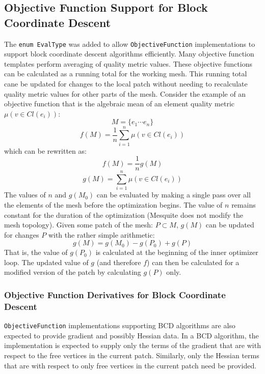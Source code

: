 \documentclass{article}
\begin{document}
\subsection{Objective Function Support for Block Coordinate Descent}

The \texttt{enum EvalType} was added to allow \texttt{ObjectiveFunction} implementations to support block coordinate descent algorithms efficiently.  Many objective function templates perform averaging of quality metric values.  These objective functions can be calculated as a running total for the working mesh.  This running total cane be updated for changes to the local patch without needing to recalculate quality metric values for other parts of the mesh.  Consider the example of an objective function that is the algebraic mean of an element quality metric $\mu(v \in Cl(e_i))$:
\begin{displaymath}
M = \{ e_1 \cdots e_n \}
\end{displaymath}
\begin{displaymath}
f(M) = \frac{1}{n}\sum_{i=1}^{n}\mu(v \in Cl(e_i))
\end{displaymath}
which can be rewritten as:
\begin{displaymath}
f(M) = \frac{1}{n}g(M)
\end{displaymath}
\begin{displaymath}
g(M) = \sum_{i=1}^{n}\mu(v \in Cl(e_i))
\end{displaymath}
The values of $n$ and $g(M_0)$ can be evaluated by making a single pass over all the elements of the mesh before the optimization begins.  The value of $n$ remains constant for the duration of the optimization (Mesquite does not modify the mesh topology).  Given some patch of the mesh: $P \subset M$, $g(M)$ can be updated for changes $P$ with the rather simple arithmetic:
\begin{displaymath}
g(M) = g(M_0) - g(P_0) + g(P)
\end{displaymath}
That is, the value of $g(P_0)$ is calculated at the beginning of the inner optimizer loop.  The updated value of $g$ (and therefore $f$) can then be calculated for a modified version of the patch by calculating $g(P)$ only.


\subsubsection{Objective Function Derivatives for Block Coordinate Descent}

\texttt{ObjectiveFunction} implementations supporting BCD algorithms are also expected to provide gradient and possibly Hessian data.  In a BCD algorithm, the implementation is expected to supply only the terms of the gradient that are with respect to the free vertices in the current patch.  Similarly, only the Hessian terms that are with respect to only free vertices in the current patch need be provided.  
\end{document}
